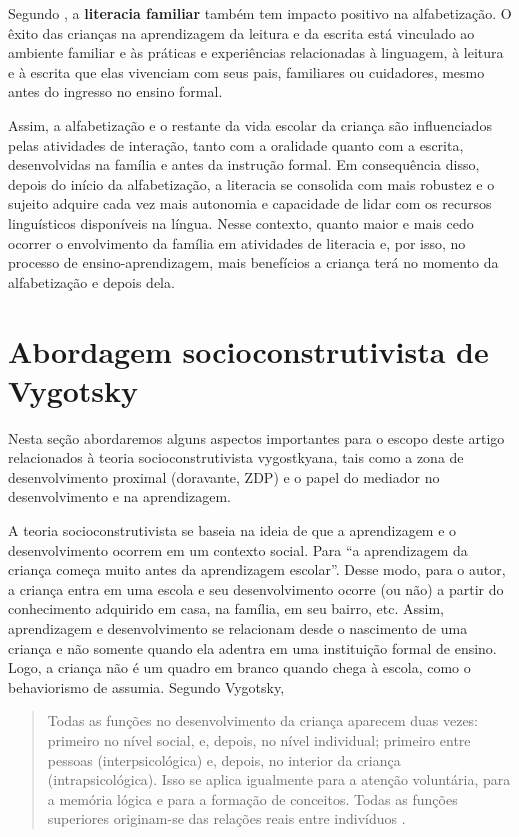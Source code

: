 \documentclass{textolivre}
\begin{document}
Segundo \textcite{wasik2004, senechal2008}, a \textbf{literacia familiar} também tem impacto positivo na alfabetização. O êxito das crianças na aprendizagem da leitura e da escrita está vinculado ao ambiente familiar e às práticas e experiências relacionadas à linguagem, à leitura e à escrita que elas vivenciam com seus pais, familiares ou cuidadores, mesmo antes do ingresso no ensino formal. 

Assim, a alfabetização e o restante da vida escolar da criança são influenciados pelas atividades de interação, tanto com a oralidade quanto com a escrita, desenvolvidas na família e antes da instrução formal. Em consequência disso, depois do início da alfabetização, a literacia se consolida com mais robustez e o sujeito adquire cada vez mais autonomia e capacidade de lidar com os recursos linguísticos disponíveis na língua. Nesse contexto, quanto maior e mais cedo ocorrer o envolvimento da família em atividades de literacia e, por isso, no processo de ensino-aprendizagem, mais benefícios a criança terá no momento da alfabetização e depois dela.

\section{Abordagem socioconstrutivista de Vygotsky}\label{abordagem}
Nesta seção abordaremos alguns aspectos importantes para o escopo deste artigo relacionados à teoria socioconstrutivista vygostkyana, tais como a zona de desenvolvimento proximal (doravante, ZDP) e o papel do mediador no desenvolvimento e na aprendizagem. 

A teoria socioconstrutivista se baseia na ideia de que a aprendizagem e o desenvolvimento ocorrem em um contexto social. Para \textcite{vygotski1991} “a aprendizagem da criança começa muito antes da aprendizagem escolar”. Desse modo, para o autor, a criança entra em uma escola e seu desenvolvimento ocorre (ou não) a partir do conhecimento adquirido em casa, na família, em seu bairro, etc. Assim, aprendizagem e desenvolvimento se relacionam desde o nascimento de uma criança e não somente quando ela adentra em uma instituição formal de ensino.  Logo, a criança não é um quadro em branco quando chega à escola, como o behaviorismo de \cite{skinner1983} assumia. Segundo Vygotsky,  

\begin{quote}
Todas as funções no desenvolvimento da criança aparecem duas vezes: primeiro no nível social, e, depois, no nível individual; primeiro entre pessoas (interpsicológica) e, depois, no interior da criança (intrapsicológica). Isso se aplica igualmente para a atenção voluntária, para a memória lógica e para a formação de conceitos. Todas as funções superiores originam-se das relações reais entre indivíduos \cite[p. 75]{vygotski1991}.
\end{quote}
\end{document}
